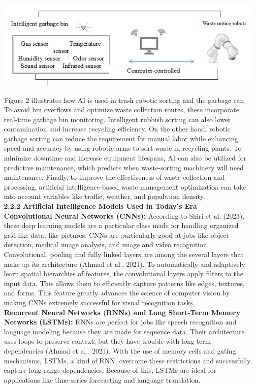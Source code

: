 \documentclass[a4paper,11pt,onecolumn]{article}
\begin{document}
\includegraphics{mab.png}

Figure 2 illustrates how AI is used in trash robotic sorting and the garbage can. \\To avoid bin overflows and optimize waste collection routes, these incorporate real-time garbage bin monitoring. Intelligent rubbish sorting can also lower contamination and increase recycling efficiency. On the other hand, robotic garbage sorting can reduce the requirement for manual labor while enhancing speed and accuracy by using robotic arms to sort waste in recycling plants. To minimize downtime and increase equipment lifespans, AI can also be utilized for predictive maintenance, which predicts when waste-sorting machinery will need maintenance. Finally, to improve the effectiveness of waste collection and processing, artificial intelligence-based waste management optimization can take into account variables like traffic, weather, and population density.\newline \\
\textbf{2.2.2 Artificial Intelligence Models Used in Today’s Era}\\
\textbf{Convolutional Neural Networks (CNNs):} According to Shiri et al. (2023), these deep learning models are a particular class made for handling organized grid-like data, like pictures. CNNs are particularly good at jobs like object detection, medical image analysis, and image and video recognition.  Convolutional, pooling and fully linked layers are among the several layers that make up its architecture (Ahmad et al., 2021). To automatically and adaptively learn spatial hierarchies of features, the convolutional layers apply filters to the input data. This allows them to efficiently capture patterns like edges, textures, and forms. This feature greatly advances the science of computer vision by making CNNs extremely successful for visual recognition tasks. \\
\textbf{Recurrent Neural Networks (RNNs) and Long Short-Term Memory Networks (LSTMs):} RNNs are perfect for jobs like speech recognition and language modeling because they are made for sequence data. Their architecture uses loops to preserve context, but they have trouble with long-term dependencies (Ahmad et al., 2021). With the use of memory cells and gating mechanisms, LSTMs, a kind of RNN, overcome these restrictions and successfully capture long-range dependencies. Because of this, LSTMs are ideal for applications like time-series forecasting and language translation. \\
\end{document}
